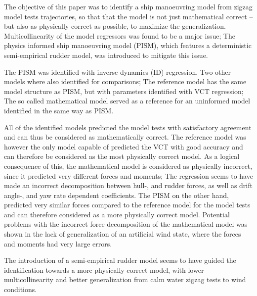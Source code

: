 The objective of this paper was to identify a ship manoeuvring model from zigzag model tests trajectories, so that that the model is not just mathematical correct -- but also as physically correct as possible, to maximize the generalization. Multicollinearity of the model regressors was found to be a major issue; The physics informed ship manoeuvring model (PISM), which features a deterministic semi-empirical rudder model, was introduced to mitigate this issue. 

The PISM was identified with inverse dynamics (ID) regression. Two other models where also identified for comparisons;
The reference model has the same model structure as PISM, but with parameters identified with VCT regression; The so called mathematical model served as a reference for an uninformed model identified in the same way as PISM.

All of the identified models predicted the model tests with satisfactory agreement and can thus be considered as mathematically correct.
The reference model was however the only model capable of predicted the VCT with good accuracy and can therefore be considered as the most physically correct model.
As a logical consequence of this, the mathematical model is considered as physically incorrect, since it predicted very different forces and moments; The regression seems to have made an incorrect decomposition between hull-, and rudder forces, as well as drift angle-, and yaw rate dependent coefficients.
The PISM on the other hand, predicted very similar forces compared to the reference model for the model tests and can therefore considered as a more physically correct model.
Potential problems with the incorrect force decomposition of the mathematical model was shown in the lack of generalization of an artificial wind state, where the forces and moments had very large errors.

The introduction of a semi-empirical rudder model seems to have guided the identification towards a more physically correct model, with lower multicollinearity and better generalization from calm water zigzag tests to wind conditions.

